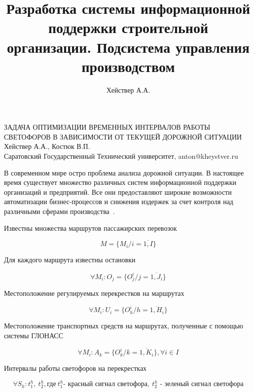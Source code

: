 \documentclass[a4paper,13pt]{article}
\title{Разработка системы информационной поддержки строительной организации. Подсистема управления производством}
\author{Хействер А.А.}
\date{}
\begin{document}
\begin{center} %
    \large ЗАДАЧА ОПТИМИЗАЦИИ ВРЕМЕННЫХ ИНТЕРВАЛОВ РАБОТЫ СВЕТОФОРОВ В ЗАВИСИМОСТИ ОТ ТЕКУЩЕЙ ДОРОЖНОЙ СИТУАЦИИ\\
    \large Хействер А.А., Костюк В.П.\\
    \large Саратовский Государственный Технический университет, anton@kheystver.ru
\end{center} %
\thispagestyle{empty} %
В современном мире остро проблема анализа дорожной ситуации. В настоящее время существует множество различных систем информационной поддержки организаций и предприятий. Все они предоставляют широкие возможности автоматизации бизнес-процессов и снижения издержек за счет контроля над различными сферами производства~\cite{pa}.

Известны множества маршрутов пассажирских перевозок

\begin{equation}\label{eq:marshruts}
M = \{ M_i/i= \overline{1,I} \}
\end{equation}

Для каждого маршрута известны остановки

\begin{equation}\label{eq:stops}
\forall M_i :O_j = \{ O^i_{j}/j = \overline{1,J_i} \}
\end{equation}

Местоположение регулируемых перекрестков на маршрутах

\begin{equation}\label{eq:crosses}
\forall M_i :U_i = \{ O^i_{h}/h = \overline{1,H_i} \}
\end{equation}

Местоположение транспортных средств на маршрутах, полученные с помощью системы ГЛОНАСС

\begin{equation}\label{eq:objects}
\forall M_i :A_k = \{ O^i_{k}/k = \overline{1,K_i} \}, \forall{i} \in I
\end{equation}

Интервалы работы светофоров на перекрестках

\begin{equation}\label{eq:crosstime}
\forall S_h :t^h_{1},\ t^h_{2}, \text{где} \ t^h_{1}\text{- красный сигнал светофора}, \ t^h_{2}\text{ - зеленый сигнал светофора}
\end{equation}
\end{document}
